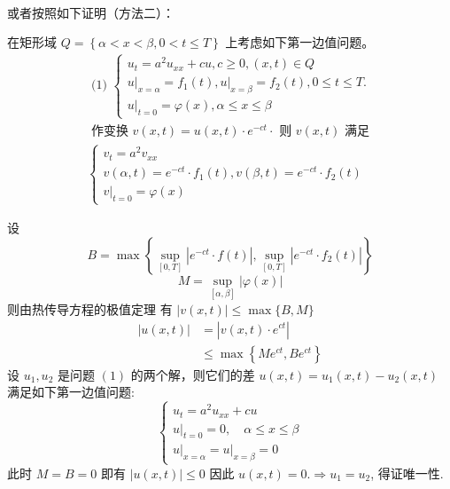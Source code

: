 \begin{questions}
\begin{solution}
~\\
或者按照如下证明（方法二）：

在矩形域 $Q=\left\{\alpha < x < \beta , 0 < t \leqslant T\right\}$ 上考虑如下第一边值问题。
$$
\begin{array}{l}
\text { (1) }\left\{\begin{array}{l}
u_{t}=a^{2} u_{x x}+c u, c \geqslant 0,(x, t) \in Q \\
\left.u\right|_{x=\alpha}=f_{1}(t),\left.u\right|_{x=\beta}=f_{2}(t), 0 \leqslant t \leqslant T . \\
\left.u\right|_{t=0}=\varphi(x), \alpha \leqslant x \leqslant \beta
\end{array}\right. \\
\text { 作变换 } v(x, t)=u(x, t) \cdot e^{-c t} \cdot \text { 则 } v(x, t) \text { 满足 } \\
\left\{\begin{array}{l}
v_{t}=a^{2} v_{x x} \\
v(\alpha, t)=e^{-c t} \cdot f_{1}(t), v(\beta, t)=e^{-c t} \cdot f_{2}(t) \\
\left.v\right|_{t=0}=\varphi(x)
\end{array}\right. 
\end{array}
$$

设
$$B=\max \left\{\sup _{[0, T]}\left|e^{-c t} \cdot f(t)\right|, \sup _{[0, T]}\left|e^{-c t} \cdot f_{2}(t)\right|\right\}$$
$$M=\sup _{[\alpha, \beta]}|\varphi(x)|$$
则由热传导方程的极值定理
有 
$|v(x, t)| \leqslant \max \{B , M\}$
$$
\begin{aligned}
|u(x, t)| & =\left|v(x, t) \cdot e^{c t}\right| \\
& \leqslant \max \left\{M e^{c t}, B e^{c t}\right\}
\end{aligned}
$$
设 $u_{1} , u_{2}$ 是问题 $(1)$ 的两个解，则它们的差 $u(x, t)=u_{1}(x, t)-u_{2}(x, t)$ 满足如下第一边值问题:
$$
\left\{\begin{array}{l}
u_{t}=a^{2} u_{x x}+c u \\
\left.u\right|_{t=0}=0 ,\quad \alpha \leqslant x \leqslant \beta \\
\left.u\right|_{x=\alpha}=\left.u\right|_{x=\beta}=0
\end{array}\right.
$$
此时 $ M=B=0 $ 即有 $ |u(x, t)| \leqslant 0 $
因此 $ u(x, t)=0 . \Rightarrow u_{1}=u_{2} $, 得证唯一性.


\end{solution}
\end{questions}
